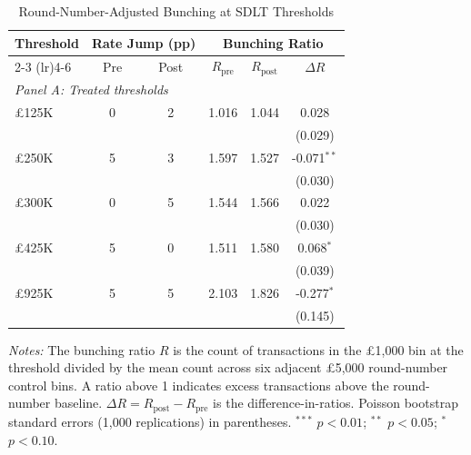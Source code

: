 \begin{table}[htbp]
\centering
\caption{Round-Number-Adjusted Bunching at SDLT Thresholds}
\label{tab:main_bunching}
\begin{tabular}{lccccc}
\hline\hline
Threshold & \multicolumn{2}{c}{Rate Jump (pp)} & \multicolumn{3}{c}{Bunching Ratio} \\
\cmidrule(lr){2-3} \cmidrule(lr){4-6}
 & Pre & Post & $R_{\text{pre}}$ & $R_{\text{post}}$ & $\Delta R$ \\
\hline
\multicolumn{6}{l}{\textit{Panel A: Treated thresholds}} \\
\pounds 125K & 0 & 2 & 1.016 & 1.044 & 0.028 \\
 & & & & & (0.029) \\
\pounds 250K & 5 & 3 & 1.597 & 1.527 & -0.071$^{**}$ \\
 & & & & & (0.030) \\
\pounds 300K & 0 & 5 & 1.544 & 1.566 & 0.022 \\
 & & & & & (0.030) \\
\pounds 425K & 5 & 0 & 1.511 & 1.580 & 0.068$^{*}$ \\
 & & & & & (0.039) \\
\pounds 925K & 5 & 5 & 2.103 & 1.826 & -0.277$^{*}$ \\
 & & & & & (0.145) \\
\hline\hline
\end{tabular}
\begin{tablenotes}
\item \textit{Notes:} The bunching ratio $R$ is the count of transactions in the \pounds 1,000 bin at the threshold divided by the mean count across six adjacent \pounds 5,000 round-number control bins. A ratio above 1 indicates excess transactions above the round-number baseline. $\Delta R = R_{\text{post}} - R_{\text{pre}}$ is the difference-in-ratios. Poisson bootstrap standard errors (1,000 replications) in parentheses. $^{***}$ $p < 0.01$; $^{**}$ $p < 0.05$; $^{*}$ $p < 0.10$.
\end{tablenotes}
\end{table}
